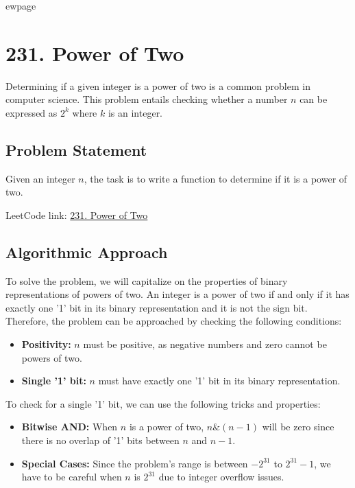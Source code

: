 
ewpage
\chapter{231. Power of Two}
\label{chap:power_of_two}

Determining if a given integer is a power of two is a common problem in computer science. This problem entails checking whether a number \(n\) can be expressed as \(2^k\) where \(k\) is an integer.

\section*{Problem Statement}

Given an integer \(n\), the task is to write a function to determine if it is a power of two.

LeetCode link: \href{https://leetcode.com/problems/power-of-two/}{231. Power of Two}

\section*{Algorithmic Approach}

To solve the problem, we will capitalize on the properties of binary representations of powers of two. An integer is a power of two if and only if it has exactly one '1' bit in its binary representation and it is not the sign bit. Therefore, the problem can be approached by checking the following conditions:
\begin{itemize}
    \item \textbf{Positivity:} \(n\) must be positive, as negative numbers and zero cannot be powers of two.
    \item \textbf{Single '1' bit:} \(n\) must have exactly one '1' bit in its binary representation.
\end{itemize}

To check for a single '1' bit, we can use the following tricks and properties:
\begin{itemize}
    \item \textbf{Bitwise AND:} When \(n\) is a power of two, \(n \& (n-1)\) will be zero since there is no overlap of '1' bits between \(n\) and \(n-1\).
    \item \textbf{Special Cases:} Since the problem's range is between \(-2^{31}\) to \(2^{31} - 1\), we have to be careful when \(n\) is \(2^{31}\) due to integer overflow issues.
\end{itemize}

